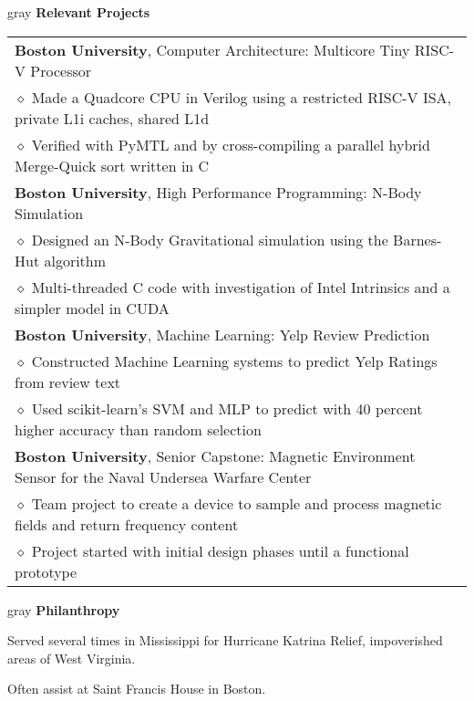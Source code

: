 \documentclass[10.5pt,letterpaper]{article}
\newcommand{\org}[1]{\textbf{#1}}
\newcommand{\pseudoitem}{\diamond}
\newcommand{\vertspace}{\vspace{1.2mm}}
\newcommand{\minorindent}{\hspace{4.5mm}}
\newcommand{\minoritem}{\minorindent $\pseudoitem$ }
\newcommand{\tablewidth}{.9\linewidth}
\newcommand{\undergrad}{Boston University}
\newcommand{\grad}{Boston University}
\begin{document}
	\vertspace
	\noindent
	\begin{heading}{gray}
		\textbf{Relevant Projects}
	\end{heading}
	\begin{tabular*}{\tablewidth}{@{\extracolsep{\fill}}l}
		\org{\grad}, Computer Architecture: Multicore Tiny RISC-V Processor\\
		\minoritem Made a Quadcore CPU in Verilog using a restricted RISC-V ISA, private L1i caches, shared L1d\\
		\minoritem Verified with PyMTL and by cross-compiling a parallel hybrid Merge-Quick sort written in C\\
		\org{\grad}, High Performance Programming: N-Body Simulation\\
		\minoritem Designed an N-Body Gravitational simulation using the Barnes-Hut algorithm\\
		\minoritem Multi-threaded C code with investigation of Intel Intrinsics and a simpler model in CUDA\\
		\org{\grad}, Machine Learning: Yelp Review Prediction\\
		\minoritem Constructed Machine Learning systems to predict Yelp Ratings from review text \\
		\minoritem Used scikit-learn's SVM and MLP to predict with 40 percent higher accuracy than random selection \\
		\org{\undergrad}, Senior Capstone: Magnetic Environment Sensor for the Naval Undersea Warfare Center\\
		\minoritem Team project to create a device to sample and process magnetic fields and return frequency content\\
		\minoritem Project started with initial design phases until a functional prototype\\
	\end{tabular*}
	

	
	\vertspace
	\noindent
	\begin{heading}{gray}
		\textbf{Philanthropy}
	\end{heading}
	Served several times in Mississippi for Hurricane Katrina Relief, impoverished areas of West Virginia.
	
	Often assist at Saint Francis House in Boston.
\end{document}

